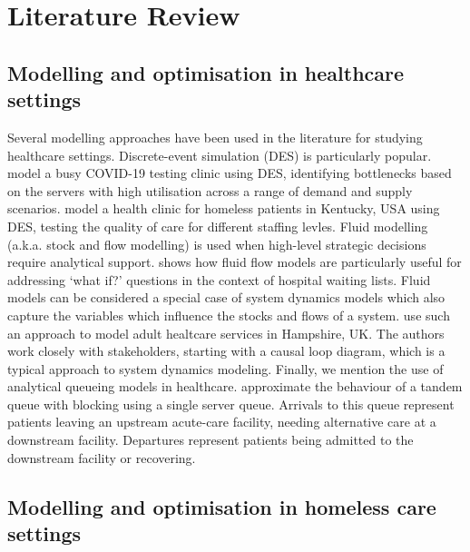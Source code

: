 \documentclass[12pt,a4paper]{article}
\begin{document}
\newpage

\section{Literature Review} \label{lit-rev}

\subsection{Modelling and optimisation in healthcare settings}

Several modelling approaches have been used in the literature for studying healthcare settings. Discrete-event simulation (DES) is particularly popular. \cite{el2021supporting} model a busy COVID-19 testing clinic using DES, identifying bottlenecks based on the servers with high utilisation across a range of demand and supply scenarios. \cite{reynolds2010design} model a health clinic for homeless patients in Kentucky, USA using DES, testing the quality of care for different staffing levles. Fluid modelling (a.k.a. stock and flow modelling) is used when high-level strategic decisions require analytical support. \cite{worthington1991hospital} shows how fluid flow models are particularly useful for addressing `what if?' questions in the context of hospital waiting lists. Fluid models can be considered a special case of system dynamics models which also capture the variables which influence the stocks and flows of a system. \cite{desai2008modelling} use such an approach to model adult healtcare services in Hampshire, UK. The authors work closely with stakeholders, starting with a causal loop diagram, which is a typical approach to system dynamics modeling. Finally, we mention the use of analytical queueing models in healthcare. \cite{weiss1987administrative} approximate the behaviour of a tandem queue with blocking using a single server queue. Arrivals to this queue represent patients leaving an upstream acute-care facility, needing alternative care at a downstream facility. Departures represent patients being admitted to the downstream facility or recovering.

\subsection{Modelling and optimisation in homeless care settings}
\end{document}
